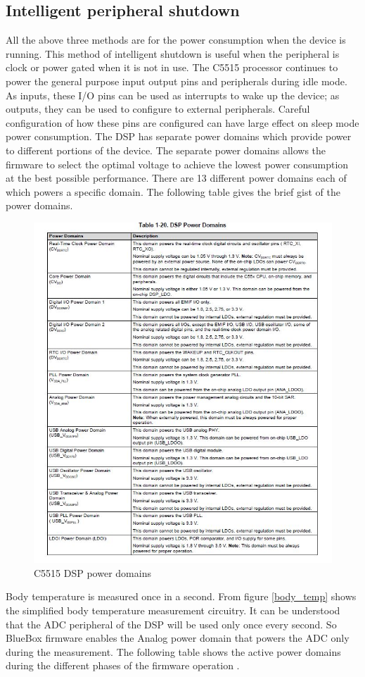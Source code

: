 \subsection{Intelligent peripheral shutdown}
All the above three methods are for the power consumption when the device is running. This method of intelligent shutdown is useful when the peripheral is clock or power gated when it is not in use. The C5515 processor continues to power the general purpose input output pins and peripherals during idle mode. As inputs, these I/O pins can be used as interrupts to wake 
up the device; as outputs, they can be used to configure to external peripherals. Careful configuration of how these pins are configured can have large effect on sleep mode power consumption. 
The DSP has separate power domains which provide power to different portions of the device. The separate power domains allows the firmware to select the optimal voltage to achieve the lowest power consumption at the best possible performance. There are 13 different power domains each of which powers a specific domain. The following table gives the brief gist of the power domains.
\begin{figure}[h]
	\centering
	\includegraphics[scale = 0.5 ]{power_domain.JPG}
	\caption{C5515 DSP power domains\label{power_domain}}
\end{figure}
Body temperature is measured once in a second. From figure \ref{body_temp} shows the simplified body temperature measurement circuitry. It can be understood that the ADC peripheral of the DSP will be used only once every second. So BlueBox firmware enables the Analog power domain that powers the ADC only during the measurement. The following table shows the active power domains during the different phases of the firmware operation .

